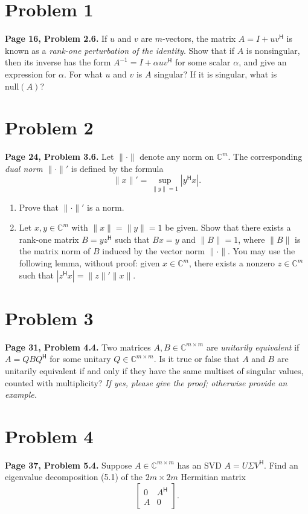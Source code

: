 \documentclass[11pt]{article}
\newcommand{\Hh}{^{\mathsf H}}
\begin{document}
\section*{Problem 1}
\textbf{Page 16, Problem 2.6.} If $u$ and $v$ are $m$-vectors, the matrix $A = I + uv\Hh$ is known as a
\emph{rank-one perturbation of the identity}. Show that if $A$ is nonsingular, then its inverse
has the form $A^{-1} = I + \alpha uv\Hh$ for some scalar $\alpha$, and give an expression for
$\alpha$. For what $u$ and $v$ is $A$ singular? If it is singular, what is $\mathrm{null}(A)$?

\section*{Problem 2}
\textbf{Page 24, Problem 3.6.} Let $\|\cdot\|$ denote any norm on $\mathbb{C}^m$. The corresponding
\emph{dual norm} $\|\cdot\|'$ is defined by the formula
\[
\|x\|' = \sup_{\|y\| = 1} |y\Hh x|.
\]
\begin{enumerate}
\item[(a)] Prove that $\|\cdot\|'$ is a norm.
\item[(b)] Let $x, y \in \mathbb{C}^m$ with $\|x\| = \|y\| = 1$ be given. Show that there exists a
rank-one matrix $B = yz\Hh$ such that $Bx = y$ and $\|B\| = 1$, where $\|B\|$ is the matrix
norm of $B$ induced by the vector norm $\|\cdot\|$. You may use the following lemma,
without proof: given $x \in \mathbb{C}^m$, there exists a nonzero $z \in \mathbb{C}^m$ such
that $|z\Hh x| = \|z\|' \|x\|$.
\end{enumerate}

\section*{Problem 3}
\textbf{Page 31, Problem 4.4.} Two matrices $A, B \in \mathbb{C}^{m \times m}$ are \emph{unitarily
equivalent} if $A = QBQ\Hh$ for some unitary $Q \in \mathbb{C}^{m \times m}$. Is it true or
false that $A$ and $B$ are unitarily equivalent if and only if they have the same multiset
of singular values, counted with multiplicity? \textit{If yes, please give the proof; otherwise
provide an example.}

\section*{Problem 4}
\textbf{Page 37, Problem 5.4.} Suppose $A \in \mathbb{C}^{m \times m}$ has an SVD $A = U\Sigma V\Hh$.
Find an eigenvalue decomposition (5.1) of the $2m \times 2m$ Hermitian matrix
\[
\begin{bmatrix} 0 & A\Hh \\ A & 0 \end{bmatrix}.
\]
\end{document}
